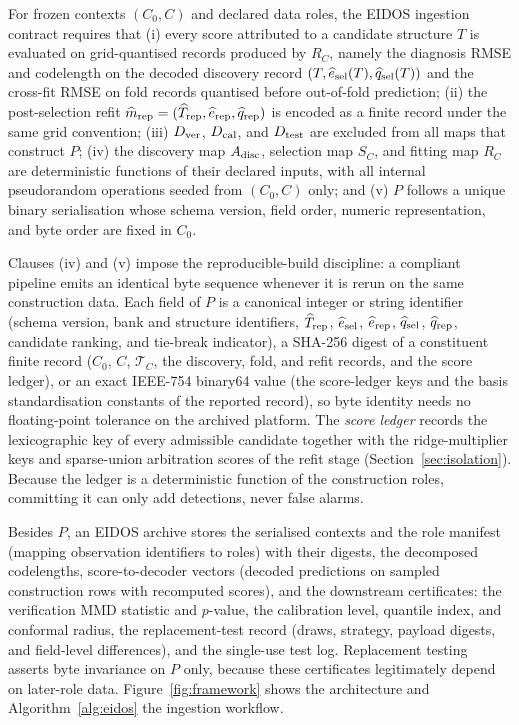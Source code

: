 \begin{definition}\label{def:eidoscontract}
For frozen contexts \((C_0,C)\) and declared data roles, the EIDOS ingestion contract requires that (i) every score attributed to a candidate structure \(T\) is evaluated on grid-quantised records produced by \(R_C\), namely the diagnosis RMSE and codelength on the decoded discovery record \((T,\widehat e_{\rm sel}(T),\widehat q_{\rm sel}(T))\) and the cross-fit RMSE on fold records quantised before out-of-fold prediction; (ii) the post-selection refit \(\widehat m_{\rm rep}=(\widehat T_{\rm rep},\widehat e_{\rm rep},\widehat q_{\rm rep})\) is encoded as a finite record under the same grid convention; (iii) \(D_{\rm ver}\), \(D_{\rm cal}\), and \(D_{\rm test}\) are excluded from all maps that construct \(P\); (iv) the discovery map \(A_{\rm disc}\), selection map \(S_C\), and fitting map \(R_C\) are deterministic functions of their declared inputs, with all internal pseudorandom operations seeded from \((C_0,C)\) only; and (v) \(P\) follows a unique binary serialisation whose schema version, field order, numeric representation, and byte order are fixed in \(C_0\).
\end{definition}

Clauses (iv) and (v) impose the reproducible-build discipline: a compliant pipeline emits an identical byte sequence whenever it is rerun on the same construction data. Each field of \(P\) is a canonical integer or string identifier (schema version, bank and structure identifiers, \(\widehat T_{\rm rep}\), \(\widehat e_{\rm sel}\), \(\widehat e_{\rm rep}\), \(\widehat q_{\rm sel}\), \(\widehat q_{\rm rep}\), candidate ranking, and tie-break indicator), a SHA-256 digest of a constituent finite record (\(C_0\), \(C\), \(\mathcal T_C\), the discovery, fold, and refit records, and the score ledger), or an exact IEEE-754 binary64 value (the score-ledger keys and the basis standardisation constants of the reported record), so byte identity needs no floating-point tolerance on the archived platform. The \emph{score ledger} records the lexicographic key of every admissible candidate together with the ridge-multiplier keys and sparse-union arbitration scores of the refit stage (Section~\ref{sec:isolation}). Because the ledger is a deterministic function of the construction roles, committing it can only add detections, never false alarms.

Besides \(P\), an EIDOS archive stores the serialised contexts and the role manifest (mapping observation identifiers to roles) with their digests, the decomposed codelengths, score-to-decoder vectors (decoded predictions on sampled construction rows with recomputed scores), and the downstream certificates: the verification MMD statistic and \(p\)-value, the calibration level, quantile index, and conformal radius, the replacement-test record (draws, strategy, payload digests, and field-level differences), and the single-use test log. Replacement testing asserts byte invariance on \(P\) only, because these certificates legitimately depend on later-role data. Figure~\ref{fig:framework} shows the architecture and Algorithm~\ref{alg:eidos} the ingestion workflow.

